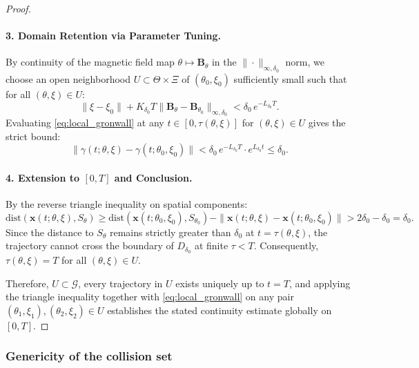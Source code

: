 \documentclass{article}
\begin{document}
\begin{proof}
	\paragraph{3. Domain Retention via Parameter Tuning.}
	By continuity of the magnetic field map $\theta \mapsto \mathbf{B}_\theta$ in the $\|\cdot\|_{\infty,\delta_0}$ norm, we choose an open neighborhood $U \subset \Theta \times \Xi$ of $(\theta_0,\xi_0)$ sufficiently small such that for all $(\theta,\xi) \in U$:
	\begin{equation}
		\|\xi - \xi_0\| + K_{\delta_0} T \|\mathbf{B}_\theta - \mathbf{B}_{\theta_0}\|_{\infty,\delta_0} < \delta_0 \, e^{-L_{\delta_0} T} .
	\end{equation}
	Evaluating \eqref{eq:local_gronwall} at any $t \in [0, \tau(\theta,\xi)]$ for $(\theta,\xi) \in U$ gives the strict bound:
	\begin{equation} \label{eq:strict_dist_bound}
		\|\gamma(t;\theta,\xi) - \gamma(t;\theta_0,\xi_0)\| < \delta_0 \, e^{-L_{\delta_0} T} \cdot e^{L_{\delta_0} t} \le \delta_0 .
	\end{equation}
	
	\paragraph{4. Extension to $[0,T]$ and Conclusion.}
	By the reverse triangle inequality on spatial components:
	\begin{equation}
		\mathrm{dist}(\mathbf{x}(t;\theta,\xi), S_\theta) \ge \mathrm{dist}(\mathbf{x}(t;\theta_0,\xi_0), S_{\theta_0}) - \|\mathbf{x}(t;\theta,\xi) - \mathbf{x}(t;\theta_0,\xi_0)\| > 2\delta_0 - \delta_0 = \delta_0 .
	\end{equation}
	Since the distance to $S_\theta$ remains strictly greater than $\delta_0$ at $t = \tau(\theta,\xi)$, the trajectory cannot cross the boundary of $D_{\delta_0}$ at finite $\tau < T$. Consequently, $\tau(\theta,\xi) = T$ for all $(\theta,\xi) \in U$. 
	
	Therefore, $U \subset \mathcal{G}$, every trajectory in $U$ exists uniquely up to $t = T$, and applying the triangle inequality together with \eqref{eq:local_gronwall} on any pair $(\theta_1,\xi_1), (\theta_2,\xi_2) \in U$ establishes the stated continuity estimate globally on $[0,T]$.
\end{proof}
	
	\subsubsection{Genericity of the collision set}
	
\end{document}
